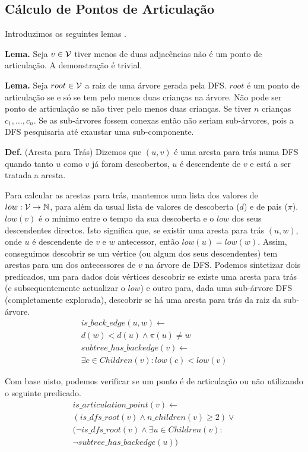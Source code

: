 \documentclass[a4paper, 12pt, conference, portuguese]{ieeeconf}
\begin{document}
\subsection{Cálculo de Pontos de Articulação}\label{art}
Introduzimos os seguintes lemas .

\textbf{Lema.} Seja $v \in {\cal V}$ tiver menos de duas adjacências não é um ponto
de articulação. A demonstração é trivial.

\textbf{Lema.} Seja $root \in {\cal V}$ a raiz de uma árvore gerada pela DFS.
$root$ é
um ponto de articulação se e só se tem pelo menos duas crianças na árvore. Não pode ser
ponto de articulação se não tiver pelo menos duas crianças. Se tiver $n$
crianças $c_1, \ldots, c_n$. Se as sub-árvores fossem conexas então não seriam
sub-árvores, pois a DFS pesquisaria até exaustar uma sub-componente.

\textbf{Def. } (Aresta para Trás) Dizemos que $(u, v)$ é uma aresta para trás
numa DFS quando tanto $u$ como $v$ já foram descobertos, $u$ é descendente de
$v$ e está a ser tratada a aresta.

Para calcular as arestas para trás, mantemos uma lista dos valores de $low:
{\cal V} \to \mathbb{N}$, para além da usual lista de valores de descoberta
($d$) e de pais ($\pi$).
$low(v)$ é o mínimo entre o tempo da sua descoberta e
o $low$ dos seus descendentes directos. Isto significa que, se existir uma aresta
para trás $(u, w)$, onde $u$ é descendente de $v$ e $w$ antecessor, então
$low(u) = low(w)$. Assim, conseguimos descobrir se um vértice (ou algum dos seus
descendentes) tem arestas para um dos antecessores de $v$ na árvore de DFS.
Podemos sintetizar dois predicados, um para dados dois vértices descobrir se
existe uma aresta para trás (e subsequentemente actualizar o $low$) e outro
para, dada uma sub-árvore DFS (completamente explorada), descobrir se há uma
aresta para trás da raiz da sub-árvore.
\begin{align*}
  is\_back\_edge(u, w) \leftarrow \\ d(w) < d(u) \land \pi(u) \neq w \\
  subtree\_has\_backedge(v) \leftarrow \\ \exists c \in Children(v) : low(c) < low(v)
\end{align*}

Com base nisto, podemos verificar se um ponto é de articulação ou não utilizando
o seguinte predicado.
\begin{align*}\label{predicate}
  is\_articulation\_point(v) \leftarrow \\ (is\_dfs\_root(v) \land n\_children(v) \geq
  2) \lor \\ (\lnot is\_dfs\_root(v) \land  \exists u \in Children(v) : \\ \lnot subtree\_has\_backedge(u))
\end{align*}
\end{document}
